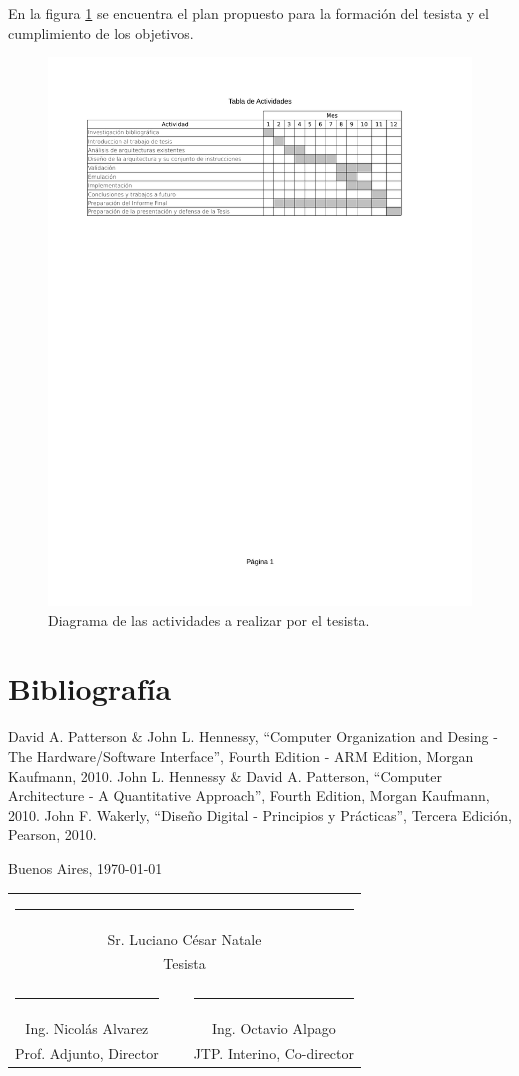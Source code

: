 \documentclass[a4paper]{article}
\newcommand{\signature}[7]{
	\vfill

	\begin{flushright}
		#1, \today
	\end{flushright}
	\vspace{3cm}

	\noindent
	\centering
	\begin{tabularx}{0.9\textwidth}{cXc}
		\multicolumn{3}{c}{\rule{5cm}{1pt}}\\
		\multicolumn{3}{c}{#2}\\
		\multicolumn{3}{c}{#3}\\
		\vspace{3cm}\\
		\rule{5cm}{1pt} & \hspace{2.5cm} & \rule{5cm}{1pt} \\
		#4 & ~ & #5 \\
		#6 & ~ & #7
	\end{tabularx}
	\vspace{1cm}
}
\begin{document}
En la figura \ref{fig:tabla_actividades} se encuentra el plan propuesto para la formación del tesista y el cumplimiento de los objetivos.

\begin{figure}[h!]
  \begin{center}
    \includegraphics[trim = 20mm 180mm 20mm 25mm, clip, width=\textwidth]{tabla_actividades}
  \end{center}
  \caption{Diagrama de las actividades a realizar por el tesista.}
  \label{fig:tabla_actividades}
\end{figure}
	
\newpage

\section{Bibliografía}

\begin{thebibliography}{99}

 David A. Patterson \& John L. Hennessy, ``Computer Organization and Desing - The Hardware/Software Interface'', Fourth Edition - ARM Edition, Morgan Kaufmann, 2010.
 John L. Hennessy \& David A. Patterson, ``Computer Architecture - A Quantitative Approach'', Fourth Edition, Morgan Kaufmann, 2010.
 John F. Wakerly, ``Diseño Digital - Principios y Prácticas'', Tercera Edición, Pearson, 2010.
\end{thebibliography}

\newpage

\signature{Buenos Aires}{Sr. Luciano César Natale}{Tesista}{Ing. Nicolás Alvarez}{Ing. Octavio Alpago}{Prof. Adjunto, Director}{JTP. Interino, Co-director}
\end{document}
